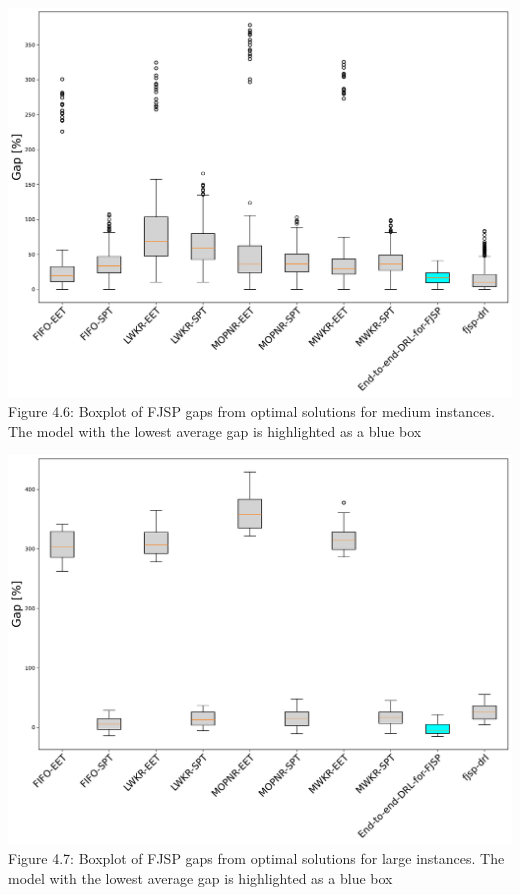 \begin{center}
    \includegraphics[width=0.8\linewidth]{images/horizontal_boxplot_fjsp_medium.pdf}\\
    Figure 4.6: Boxplot of FJSP gaps from optimal solutions for medium instances. The model with the lowest average gap is highlighted as a blue box
\end{center}
\begin{center}
    \includegraphics[width=0.8\linewidth]{images/horizontal_boxplot_fjsp_large.pdf}\\
    Figure 4.7: Boxplot of FJSP gaps from optimal solutions for large instances. The model with the lowest average gap is highlighted as a blue box
\end{center}
